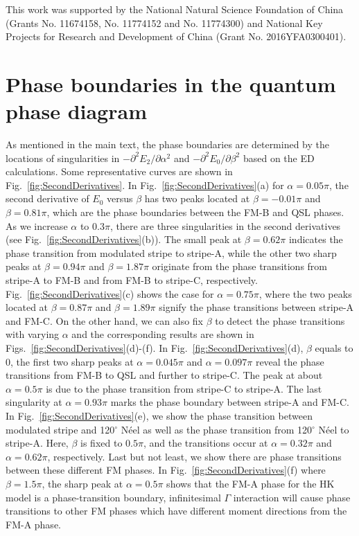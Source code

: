 \documentclass[aps,prb,reprint,amsfonts,amsmath,amssymb,showpacs,groupedaddress,superscriptaddress]{revtex4-1}
\begin{document}
\begin{acknowledgments}
This work was supported by the National Natural Science Foundation of China (Grants No. 11674158, No. 11774152 and No. 11774300) and National Key Projects for Research and Development of China (Grant No. 2016YFA0300401).
\end{acknowledgments}

\appendix

\section{\label{apx:PhaseBoundary}Phase boundaries in the quantum phase diagram}

As mentioned in the main text, the phase boundaries are determined by the locations of singularities in $-\partial^{2} E_{2} / \partial \alpha^{2}$ and $-\partial^{2} E_{0} / \partial \beta^{2}$ based on the ED calculations. Some representative curves are shown in Fig.~\ref{fig:SecondDerivatives}. In Fig.~\ref{fig:SecondDerivatives}(a) for $\alpha=0.05\pi$, the second derivative of $E_0$ versus $\beta$ has two peaks located at $\beta=-0.01\pi$ and $\beta=0.81\pi$, which are the phase boundaries between the FM-B and QSL phases. As we increase $\alpha$ to $0.3\pi$, there are three singularities in the second derivatives (see Fig.~\ref{fig:SecondDerivatives}(b)). The small peak at $\beta=0.62\pi$ indicates the phase transition from modulated stripe to stripe-A, while the other two sharp peaks at $\beta=0.94\pi$ and $\beta=1.87\pi$ originate from the phase transitions from stripe-A to FM-B and from FM-B to stripe-C, respectively. Fig.~\ref{fig:SecondDerivatives}(c) shows the case for $\alpha=0.75\pi$, where the two peaks located at $\beta=0.87\pi$ and $\beta=1.89\pi$ signify the phase transitions between stripe-A and FM-C. On the other hand, we can also fix $\beta$ to detect the phase transitions with varying $\alpha$ and the corresponding results are shown in Figs.~\ref{fig:SecondDerivatives}(d)-(f). In Fig.~\ref{fig:SecondDerivatives}(d), $\beta$ equals to $0$, the first two sharp peaks at $\alpha=0.045\pi$ and $\alpha=0.097\pi$ reveal the phase transitions from FM-B to QSL and further to stripe-C. The peak at about $\alpha=0.5\pi$ is due to the phase transition from stripe-C to stripe-A. The last singularity at $\alpha=0.93\pi$ marks the phase boundary between stripe-A and FM-C. In Fig.~\ref{fig:SecondDerivatives}(e), we show the phase transition between modulated stripe and 120$^\circ$ N\'{e}el as well as the phase transition from 120$^\circ$ N\'{e}el to stripe-A. Here, $\beta$ is fixed to $0.5\pi$, and the transitions occur at $\alpha=0.32\pi$ and $\alpha=0.62\pi$, respectively. Last but not least, we show there are phase transitions between these different FM phases. In Fig.~\ref{fig:SecondDerivatives}(f) where $\beta=1.5\pi$, the sharp peak at $\alpha=0.5\pi$ shows that the FM-A phase for the HK model is a phase-transition boundary, infinitesimal $\Gamma$ interaction will cause phase transitions to other FM phases which have different moment directions from the FM-A phase.
\end{document}

